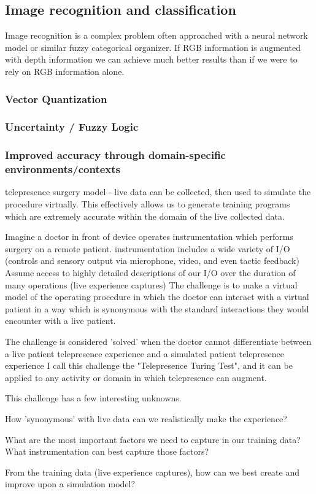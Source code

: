\documentclass[a4paper,12pt]{report}
\begin{document}
\subsection{Image recognition and classification}
Image recognition is a complex problem often approached with a neural network model or similar fuzzy categorical organizer. If RGB information is augmented with depth information we can achieve much better results than if we were to rely on RGB information alone.
\subsubsection{Vector Quantization}
\subsubsection{Uncertainty / Fuzzy Logic}
\subsubsection{Improved accuracy through domain-specific environments/contexts}
telepresence surgery model - live data can be collected, then used to simulate the procedure virtually. 
This effectively allows us to generate training programs which are extremely accurate within the domain of the live collected data.

Imagine a doctor in front of device operates instrumentation which performs surgery on a remote patient.
instrumentation includes a wide variety of I/O (controls and sensory output via microphone, video, and even tactic feedback)
Assume access to highly detailed descriptions of our I/O over the duration of many operations (live experience captures)
The challenge is to make a virtual model of the operating procedure in which the doctor can interact with a virtual patient in a way which is synonymous with the standard interactions they would encounter with a live patient.

The challenge is considered 'solved' when the doctor cannot differentiate between a live patient telepresence experience and a simulated patient telepresence experience
I call this challenge the "Telepresence Turing Test", and it can be applied to any activity or domain in which telepresence can augment.

This challenge has a few interesting unknowns.

How 'synonymous' with live data can we realistically make the experience?

What are the most important factors we need to capture in our training data? What instrumentation can best capture those factors?

From the training data (live experience captures), how can we best create and improve upon a simulation model?\cite{391769} 



\end{document}
